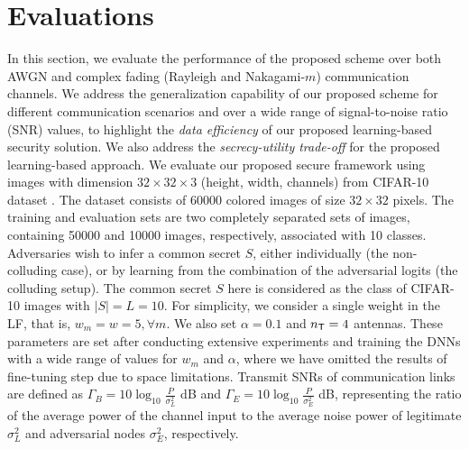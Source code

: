 \documentclass[conference]{IEEEtran}
\begin{document}
{	\section{Evaluations}\label{sec:evaluation}
	\vspace{0mm}
	In this section, we evaluate  the performance of the proposed scheme over  both  AWGN and complex  fading (Rayleigh and Nakagami-$m$) communication channels.  
	We  address  the generalization capability of our proposed scheme for different communication scenarios and over a wide range of signal-to-noise ratio (SNR) values, to highlight the  \emph{data efficiency} of our proposed learning-based security  solution. 
	We also address the \emph{secrecy-utility trade-off} for the proposed learning-based approach. 
		We evaluate our proposed secure framework using images
		with dimension $32 \times 32 \times 3$ (height, width, channels) from CIFAR-10 dataset \cite{CIFARdataset}. 
 The dataset consists of 60000
		colored images of size $32 \times 32$ pixels. The training and
		evaluation sets are two completely separated sets of images,
		containing 50000 and 10000 images, respectively, associated
		with 10 classes.
	Adversaries wish to 
	infer a common secret $S$,  
	either individually (the non-colluding case), or by 
	learning from 
	the combination of the adversarial  logits
	(the colluding setup).
	The common secret $S$ here is considered as the  class of CIFAR-10 images with $|S| = L = 10$.  
	For simplicity, we consider a single weight in the LF, that is, $w_m = w = 5, \forall m$. We also set  $\alpha = 0.1$ and $n_{\sf T} = 4$ antennas. 
	These parameters are set after conducting extensive experiments and training the DNNs with a wide range of values for $w_m$ and $\alpha$, where we have omitted the  results of fine-tuning step due to space limitations.  
{Transmit SNRs of communication links are  defined as
	$	\Gamma_{B}=10\log_{10}\frac{P}{\sigma_{L}^2}$ dB and   $\Gamma_{E}=10\log_{10}\frac{P}{\sigma_{E}^2}$ dB, 
	 representing the ratio of the average power of the channel input to the average noise power of legitimate $\sigma^2_{L}$ and adversarial nodes $\sigma^2_{E}$, respectively. 
}}
\end{document}
